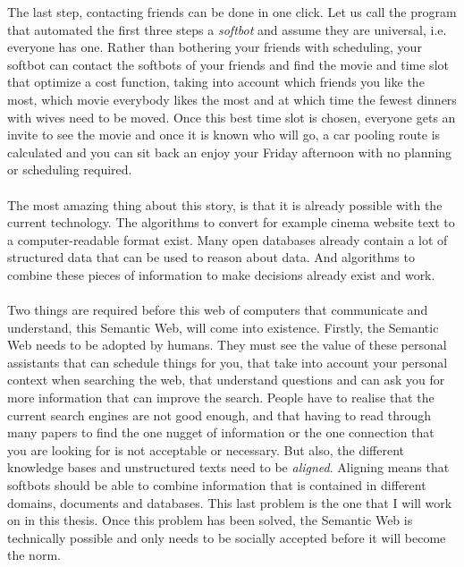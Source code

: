 \documentclass{article}
\begin{document}
 The last step, contacting friends can be done in one click. Let us call the program that automated the first three steps a \emph{softbot} and assume they are universal, i.e. everyone has one. Rather than bothering your friends with scheduling, your softbot can contact the softbots of your friends and find the movie and time slot that optimize a cost function, taking into account which friends you like the most, which movie everybody likes the most and at which time the fewest dinners with wives need to be moved. Once this best time slot is chosen, everyone gets an invite to see the movie and once it is known who will go, a car pooling route is calculated and you can sit back an enjoy your Friday afternoon with no planning or scheduling required.
 \paragraph{}
 The most amazing thing about this story, is that it is already possible with the current technology. The algorithms to convert for example cinema website text to a computer-readable format exist. Many open databases already contain a lot of structured data that can be used to reason about data. And algorithms to combine these pieces of information to make decisions already exist and work.
 \paragraph{}
 Two things are required before this web of computers that communicate and understand, this Semantic Web, will come into existence.
 Firstly, the Semantic Web needs to be adopted by humans. They must see the value of these personal assistants that can schedule things for you, that take into account your personal context when searching the web, that understand questions and can ask you for more information that can improve the search. People have to realise that the current search engines are not good enough, and that having to read through many papers to find the one nugget of information or the one connection that you are looking for is not acceptable or necessary.
 But also, the different knowledge bases and unstructured texts need to be \emph{aligned}. Aligning means that softbots should be able to combine information that is contained in different domains, documents and databases. This last problem is the one that I will work on in this thesis. Once this problem has been solved, the Semantic Web is technically possible and only needs to be socially accepted before it will become the norm. %
\end{document}
